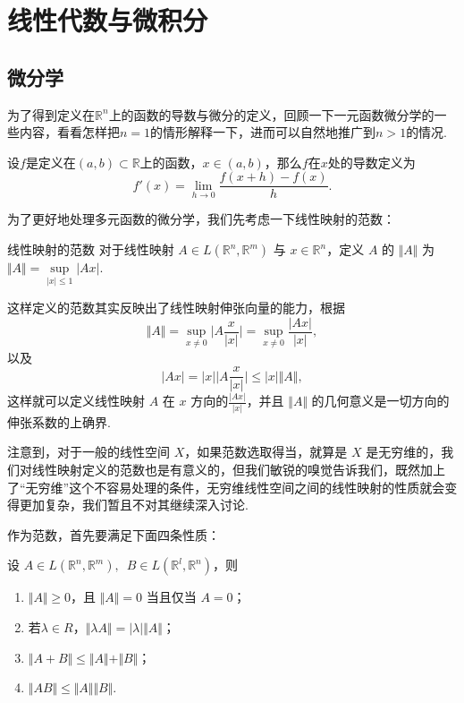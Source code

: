 \chapter{线性代数与微积分}

\section{微分学}

为了得到定义在$\mathbb{R}^n$上的函数的导数与微分的定义，回顾一下一元函数微分学的一些内容，看看怎样把$n=1$的情形解释一下，进而可以自然地推广到$n>1$的情况.

设$f$是定义在$(a,b)\subset \mathbb{R}$上的函数，$x\in(a,b)$，那么$f$在$x$处的导数定义为
\[f'(x)=\lim_{h\to 0}\frac{f(x+h)-f(x)}{h}.\]



为了更好地处理多元函数的微分学，我们先考虑一下线性映射的范数：

\begin{definition}{线性映射的范数}{}
    对于线性映射 $A\in L(\mathbb{R}^n, \mathbb{R}^m)$ 与 $x\in\mathbb{R}^n$，定义 $A$ 的 $\Vert A \Vert$ 为 $\Vert A \Vert = \sup\limits_{\vert x\vert\leqslant 1} \vert Ax\vert$.
\end{definition}

这样定义的范数其实反映出了线性映射伸张向量的能力，根据\[\Vert A\Vert = \sup\limits_{x\neq 0}\vert A\frac{x}{\vert x\vert}\vert = \sup\limits_{x\neq 0}\frac{\vert Ax\vert}{\vert x\vert},\]以及\[\vert Ax\vert = \vert x\vert \vert A\frac{x}{\vert x\vert}\vert \leqslant \vert x\vert \Vert A\Vert,\]这样就可以定义线性映射 $A$ 在 $x$ 方向的$\frac{\vert Ax\vert}{\vert x\vert}$，并且 $\Vert A\Vert$ 的几何意义是一切方向的伸张系数的上确界.

注意到，对于一般的线性空间 $X$，如果范数选取得当，就算是 $X$ 是无穷维的，我们对线性映射定义的范数也是有意义的，但我们敏锐的嗅觉告诉我们，既然加上了“无穷维”这个不容易处理的条件，无穷维线性空间之间的线性映射的性质就会变得更加复杂，我们暂且不对其继续深入讨论.

作为范数，首先要满足下面四条性质：

\begin{theorem}{}{}
    设 $A\in L(\mathbb{R}^n, \mathbb{R}^m),\enspace B\in L(\mathbb{R}^l, \mathbb{R}^n)$，则
    \begin{enumerate}
        \item $\Vert A\Vert\geqslant 0$，且 $\Vert A\Vert=0$ 当且仅当 $A=0$；
        \item 若$\lambda\in R$，$\Vert \lambda A\Vert=\vert\lambda\vert\Vert A\Vert$；
        \item $\Vert A+B\Vert\leqslant\Vert A\Vert+\Vert B\Vert$；
        \item $\Vert AB\Vert\leqslant\Vert A\Vert\Vert B\Vert$.
    \end{enumerate}
\end{theorem}

